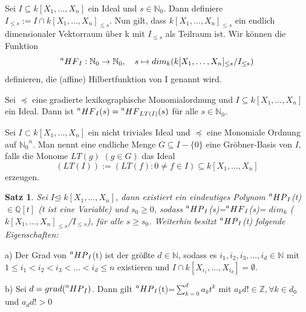 \documentclass{beamer}
\newtheorem{satz}{Satz}
\newcommand*{\R}{k[X_{1},\ldots,X_{n}]}
\newcommand*{\indx}[2]{{#1}_{#2}}
\newcommand*{\potx}[2]{{#1}^{#2}}
\newcommand*{\N}{\mathbb{N}_0}
\newcommand*{\hf}[1]{$\prescript{a}{}{HF}_{#1}$}
\newcommand*{\hp}[1]{$\prescript{a}{}{HP}_{#1}$}
\newcommand*{\kette}[2]{$1\leq {#1}_1<{#1}_2<{#1}_3<...<{#1}_{#2}\leq n$}
\newcommand*{\dkette}[2]{${#1}_1,{#1}_2,{#1}_3,\ldots,{#1}_{#2} \in \mathbb{N}$}
\newcommand*{\ideal}{$I$}
\begin{document}
\begin{frame}
	\begin{definition} \label{1.2.11}
	Sei \(I \subseteq \R\) ein Ideal und \(s \in \mathbb{N}_{0}\). Dann definiere \(I_{\leq s} :=
	I \cap \R_{\leq s}\). Nun gilt, dass \(\R_{\leq s}\) ein endlich dimensionaler Vektorraum über
	k  mit \(I_{\leq s}\) als Teilraum ist. Wir können die Funktion \begin{displaymath}
	\prescript{a}{}{HF}_{I} : \mathbb{N}_{0} \rightarrow \mathbb{N}_{0}, \quad s \mapsto
	dim_{k}(\R_{\leq s}/I_{\leq s})	\end{displaymath} definieren, die (affine) Hilbertfunktion
	von I genannt wird.
	\end{definition}
\end{frame}

\begin{frame}
	\begin{lemma}[Macaulay] \label{1.2.13}
	Sei \(\preceq\) eine gradierte lexikographische Monomialordnung und \(I \subseteq \R\) ein
	Ideal. Dann ist \(\prescript{a}{}{HF}_{I}(s) = \prescript{a}{}{HF}_{LT(I)}(s)\) für alle
	\(s \in \mathbb{N}_{0}\).
	\end{lemma}
\end{frame}

\begin{frame}
	\begin{definition}[Buchberger]
		Sei $I\subset \R$ ein nicht triviales Ideal und $\preceq$ eine Monomiale Ordnung auf $\potx{\N}{n}$. Man nennt eine endliche Menge $G\subseteq I-\{0\}$ eine Gröbner-Basis von $I$, falls die Monome $LT(g)$ $(g\in G)$ das Ideal 
		\begin{displaymath}
		(LT(I)):=(LT(f):0\neq f\in I)\subseteq \R
		\end{displaymath}
		erzeugen. 
	\end{definition}
\end{frame}

\begin{frame}
	\begin{satz}
		\label{1.2.14}
		Sei  \ideal $\unlhd$ $\R$, dann existiert ein eindeutiges Polynom \hp{I}(t) $\in \mathbb{Q}[t]$ (t ist eine Variable) und $\indx{s}{0}\geq0$,  sodass \hp{I}(s)=\hf{I}(s)= $\indx{dim}{k}$ ($\indx{\R}{\leq s}$/$\indx{I}{\leq s}$), für alle $ s\geq\indx{s}{0}$. Weiterhin besitzt \hp{I}(t) folgende Eigenschaften:	
	\end{satz}
	\begin{compactenum}
		\item[a)] Der Grad von \hp{I}(t) ist der größte $d \in \mathbb{N}$, sodass es \dkette{i}{d} mit \kette{i}{d} existieren und $I\cap k[X_{{i}_{1}},\ldots,X_{{i}_{d}}]={\emptyset}$.
		\item[b)] Sei $d=grad(\textnormal{\hp{I}})$. Dann gilt \hp{I}(t)=$\sum_{k=0}^{d} \indx{a}{k}t^k$ mit $\indx{a}{k}d! \in \mathbb{Z}, \forall k\in \underline{\indx{d}{0}}$ und $\indx{a}{d}d!>0$\\
	\end{compactenum}
\end{frame}
\end{document}
